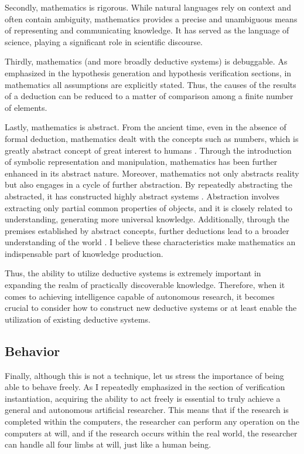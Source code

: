 \documentclass{book}
\begin{document}
Secondly, mathematics is rigorous. While natural languages rely on context and often contain ambiguity, mathematics provides a precise and unambiguous means of representing and communicating knowledge. It has served as the language of science, playing a significant role in scientific discourse.

Thirdly, mathematics (and more broadly deductive systems) is debuggable. As emphasized in the hypothesis generation and hypothesis verification sections, in mathematics all assumptions are explicitly stated. Thus, the causes of the results of a deduction can be reduced to a matter of comparison among a finite number of elements.

Lastly, mathematics is abstract. From the ancient time, even in the absence of formal deduction, mathematics dealt with the concepts such as numbers, which is greatly abstract concept of great interest to humans \cite{david2010history}. Through the introduction of symbolic representation and manipulation, mathematics has been further enhanced in its abstract nature. Moreover, mathematics not only abstracts reality but also engages in a cycle of further abstraction. By repeatedly abstracting the abstracted, it has constructed highly abstract systems \cite{bochner1968role}. Abstraction involves extracting only partial common properties of objects, and it is closely related to understanding, generating more universal knowledge. Additionally, through the premises established by abstract concepts, further deductions lead to a broader understanding of the world \cite{heisenberg2008abstraction}. I believe these characteristics make mathematics an indispensable part of knowledge production. 

Thus, the ability to utilize deductive systems is extremely important in expanding the realm of practically discoverable knowledge. Therefore, when it comes to achieving intelligence capable of autonomous research, it becomes crucial to consider how to construct new deductive systems or at least enable the utilization of existing deductive systems.

\subsection{Behavior}
Finally, although this is not a technique, let us stress the importance of being able to behave freely. As I repeatedly emphasized in the section of verification instantiation, acquiring the ability to act freely is essential to truly achieve a general and autonomous artificial researcher. This means that if the research is completed within the computers, the researcher can perform any operation on the computers at will, and if the research occurs within the real world, the researcher can handle all four limbs at will, just like a human being.
\end{document}
